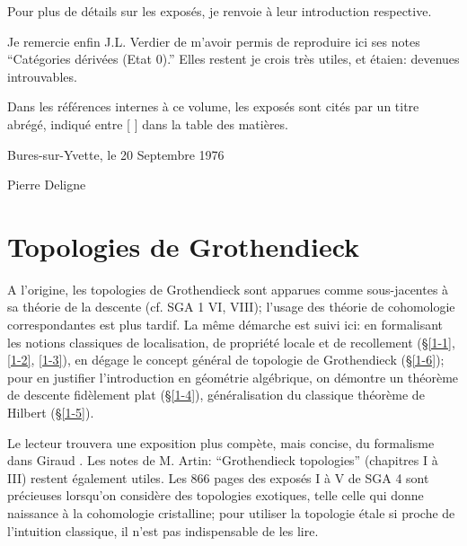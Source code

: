 \documentclass{article}
\begin{document}
Pour plus de détails sur les exposés, je renvoie à leur introduction 
respective. 

Je remercie enfin J.L. Verdier de m'avoir permis de reproduire ici ses notes 
``Catégories dérivées (Etat $0$).'' Elles restent je crois très utiles, et 
étaien: devenues introuvables. 

Dans les références internes à ce volume, les exposés sont cités par 
un titre abrégé, indiqué entre [ ] dans la table des matières. 

Bures-sur-Yvette, le 20 Septembre 1976

Pierre Deligne




















\section{Topologies de Grothendieck}\label{1}

A l'origine, les topologies de Grothendieck sont apparues comme sous-jacentes 
à sa théorie de la descente (cf. SGA 1 VI, VIII); l'usage des théorie de 
cohomologie correspondantes est plus tardif. La même démarche est suivi 
ici: en formalisant les notions classiques de localisation, de propriété 
locale et de recollement (\S\ref{1-1}, \ref{1-2}, \ref{1-3}), en dégage le 
concept général de topologie de Grothendieck (\S \ref{1-6}); pour en justifier 
l'introduction en géométrie algébrique, on démontre un théorème 
de descente fidèlement plat (\S\ref{1-4}), généralisation du classique théorème 
de Hilbert (\S\ref{1-5}). 

Le lecteur trouvera une exposition plus compète, mais concise, du 
formalisme dans Giraud \cite{Gi}. Les notes de M. Artin: ``Grothendieck 
topologies'' \cite{Ar} (chapitres I à III) restent également utiles. Les 
866 pages des exposés I à V de SGA 4 sont précieuses lorsqu'on 
considère des topologies exotiques, telle celle qui donne naissance à la 
cohomologie cristalline; pour utiliser la topologie étale si proche de 
l'intuition classique, il n'est pas indispensable de les lire. 
\end{document}
